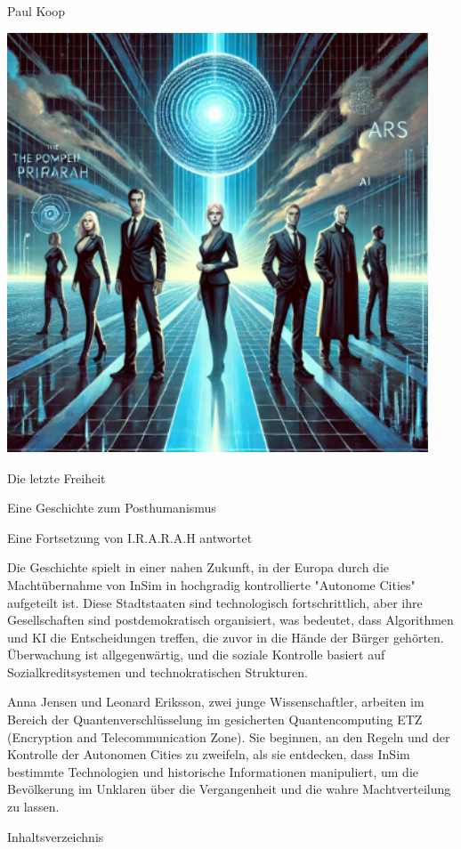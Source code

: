 \documentclass[
]{article}
\author{}
\date{}
\begin{document}
Paul Koop

\includegraphics[width=4.92849in,height=4.92031in]{media/image0001.png}

Die letzte Freiheit

Eine Geschichte zum Posthumanismus

Eine Fortsetzung von I.R.A.R.A.H antwortet

Die Geschichte spielt in einer nahen Zukunft, in der Europa durch die
Machtübernahme von InSim in hochgradig kontrollierte "Autonome Cities"
aufgeteilt ist. Diese Stadtstaaten sind technologisch fortschrittlich,
aber ihre Gesellschaften sind postdemokratisch organisiert, was
bedeutet, dass Algorithmen und KI die Entscheidungen treffen, die zuvor
in die Hände der Bürger gehörten. Überwachung ist allgegenwärtig, und
die soziale Kontrolle basiert auf Sozialkreditsystemen und
technokratischen Strukturen.

Anna Jensen und Leonard Eriksson, zwei junge Wissenschaftler, arbeiten
im Bereich der Quantenverschlüsselung im gesicherten Quantencomputing
ETZ (Encryption and Telecommunication Zone). Sie beginnen, an den Regeln
und der Kontrolle der Autonomen Cities zu zweifeln, als sie entdecken,
dass InSim bestimmte Technologien und historische Informationen
manipuliert, um die Bevölkerung im Unklaren über die Vergangenheit und
die wahre Machtverteilung zu lassen.

Inhaltsverzeichnis
\end{document}
